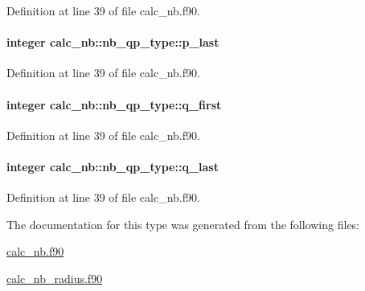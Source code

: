 Definition at line 39 of file calc\-\_\-nb.\-f90.

\hypertarget{structcalc__nb_1_1nb__qp__type_afc37ae377df00801927b168f389095cd}{
\paragraph[{p\-\_\-last}]{\setlength{\rightskip}{0pt plus 5cm}integer calc\-\_\-nb\-::nb\-\_\-qp\-\_\-type\-::p\-\_\-last}}\label{structcalc__nb_1_1nb__qp__type_afc37ae377df00801927b168f389095cd}


Definition at line 39 of file calc\-\_\-nb.\-f90.

\hypertarget{structcalc__nb_1_1nb__qp__type_a14154a509a398559e767b5e17180a93e}{
\paragraph[{q\-\_\-first}]{\setlength{\rightskip}{0pt plus 5cm}integer calc\-\_\-nb\-::nb\-\_\-qp\-\_\-type\-::q\-\_\-first}}\label{structcalc__nb_1_1nb__qp__type_a14154a509a398559e767b5e17180a93e}


Definition at line 39 of file calc\-\_\-nb.\-f90.

\hypertarget{structcalc__nb_1_1nb__qp__type_a8d11c49e691ce78272cc2b5e288ddf35}{
\paragraph[{q\-\_\-last}]{\setlength{\rightskip}{0pt plus 5cm}integer calc\-\_\-nb\-::nb\-\_\-qp\-\_\-type\-::q\-\_\-last}}\label{structcalc__nb_1_1nb__qp__type_a8d11c49e691ce78272cc2b5e288ddf35}


Definition at line 39 of file calc\-\_\-nb.\-f90.



The documentation for this type was generated from the following files\-:\begin{DoxyCompactItemize}
\item 
\hyperlink{calc__nb_8f90}{calc\-\_\-nb.\-f90}\item 
\hyperlink{calc__nb__radius_8f90}{calc\-\_\-nb\-\_\-radius.\-f90}\end{DoxyCompactItemize}
